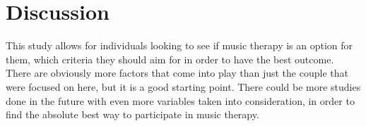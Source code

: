 \documentclass[12pt]{article}
\begin{document}
 \section{Discussion} 
 \label{sec:discussion}

 This study allows for individuals looking to see if music therapy is an option for them, which criteria they should aim for in order to have the best outcome. There are obviously more factors that come into play than just the couple that were focused on here, but it is a good starting point. There could be more studies done in the future with even more variables taken into consideration, in order to find the absolute best way to participate in music therapy.


 
 {}
\end{document}
